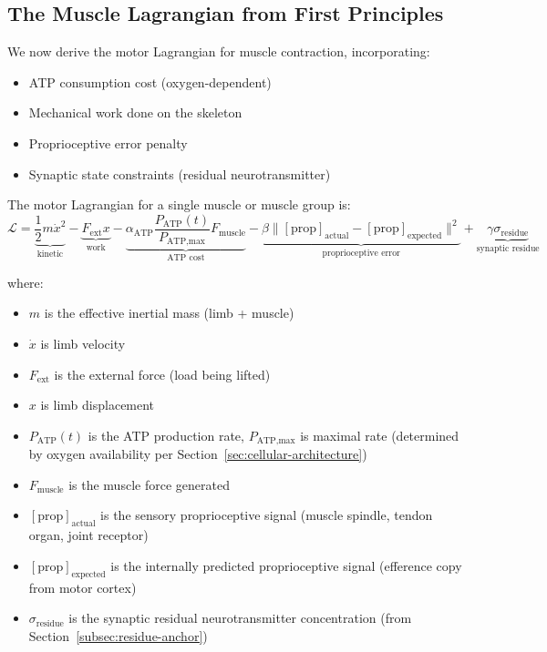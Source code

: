 \subsection{The Muscle Lagrangian from First Principles}
\label{subsec:muscle-lagrangian}

We now derive the motor Lagrangian for muscle contraction, incorporating:
\begin{itemize}
    \item ATP consumption cost (oxygen-dependent)
    \item Mechanical work done on the skeleton
    \item Proprioceptive error penalty
    \item Synaptic state constraints (residual neurotransmitter)
\end{itemize}

\begin{definition}
\label{def:muscle-lagrangian}
The motor Lagrangian for a single muscle or muscle group is:
\begin{equation}
\boxed{
\mathcal{L} = \underbrace{\frac{1}{2}m\dot{x}^2}_{\text{kinetic}} - \underbrace{F_{\text{ext}} x}_{\text{work}} - \underbrace{\alpha_{\text{ATP}} \frac{P_{\text{ATP}}(t)}{P_{\text{ATP,max}}} F_{\text{muscle}}}_{\text{ATP cost}} - \underbrace{\beta \|[\text{prop}]_{\text{actual}} - [\text{prop}]_{\text{expected}}\|^2}_{\text{proprioceptive error}} + \underbrace{\gamma \sigma_{\text{residue}}}_{\text{synaptic residue}}
}
\label{eq:muscle-lagrangian}
\end{equation}

where:
\begin{itemize}[noitemsep]
\item $m$ is the effective inertial mass (limb + muscle)
\item $\dot{x}$ is limb velocity
\item $F_{\text{ext}}$ is the external force (load being lifted)
\item $x$ is limb displacement
\item $P_{\text{ATP}}(t)$ is the ATP production rate, $P_{\text{ATP,max}}$ is maximal rate (determined by oxygen availability per Section~\ref{sec:cellular-architecture})
\item $F_{\text{muscle}}$ is the muscle force generated
\item $[\text{prop}]_{\text{actual}}$ is the sensory proprioceptive signal (muscle spindle, tendon organ, joint receptor)
\item $[\text{prop}]_{\text{expected}}$ is the internally predicted proprioceptive signal (efference copy from motor cortex)
\item $\sigma_{\text{residue}}$ is the synaptic residual neurotransmitter concentration (from Section~\ref{subsec:residue-anchor})
\end{itemize}
\end{definition}

